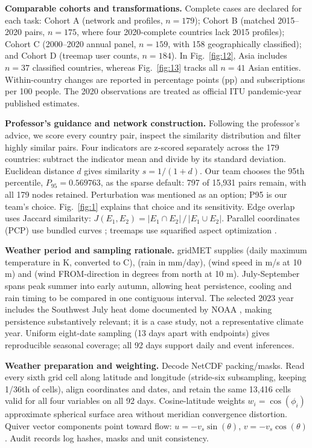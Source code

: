 \documentclass[conference,a4paper]{IEEEtran}
\begin{document}
\textbf{Comparable cohorts and transformations.} Complete cases are declared for each task: Cohort A (network and profiles, $n = 179$); Cohort B (matched 2015--2020 pairs, $n = 175$, where four 2020-complete countries lack 2015 profiles); Cohort C (2000--2020 annual panel, $n = 159$, with 158 geographically classified); and Cohort D (treemap user counts, $n = 184$). In Fig.~\ref{fig:12}, Asia includes $n = 37$ classified countries, whereas Fig.~\ref{fig:13} tracks all $n = 41$ Asian entities. Within-country changes are reported in percentage points (pp) and subscriptions per 100 people. The 2020 observations are treated as official ITU pandemic-year published estimates.

\textbf{Professor's guidance and network construction.} Following the professor's advice, we score every country pair, inspect the similarity distribution and filter highly similar pairs. Four indicators are z-scored separately across the 179 countries: subtract the indicator mean and divide by its standard deviation. Euclidean distance $d$ gives similarity $s=1/(1+d)$. Our team chooses the 95th percentile, $P_{95}=0.569763$, as the sparse default: 797 of 15,931 pairs remain, with all 179 nodes retained. Perturbation was mentioned as an option; P95 is our team's choice. Fig.~\ref{fig:1} explains that choice and its sensitivity. Edge overlap uses Jaccard similarity: $J(E_1,E_2)=|E_1 \cap E_2|\,/\,|E_1 \cup E_2|$. Parallel coordinates (PCP) use bundled curves \cite{ref10}; treemaps use squarified aspect optimization \cite{ref13}.

\textbf{Weather period and sampling rationale.} gridMET \cite{ref1} supplies  (daily maximum temperature in K, converted to C),  (rain in mm/day),  (wind speed in m/s at 10 m) and  (wind FROM-direction in degrees from north at 10 m). July-September spans peak summer into early autumn, allowing heat persistence, cooling and rain timing to be compared in one contiguous interval. The selected 2023 year includes the Southwest July heat dome documented by NOAA \cite{ref9}, making persistence substantively relevant; it is a case study, not a representative climate year. Uniform eight-date sampling (13 days apart with endpoints) gives reproducible seasonal coverage; all 92 days support daily and event inferences.

\textbf{Weather preparation and weighting.} Decode NetCDF packing/masks. Read every sixth grid cell along latitude and longitude (stride-six subsampling, keeping 1/36th of cells), align coordinates and dates, and retain the same 13,416 cells valid for all four variables on all 92 days. Cosine-latitude weights $w_i = \cos(\phi_i)$ approximate spherical surface area without meridian convergence distortion. Quiver vector components point toward flow: $u = -v_s \sin(\theta)$, $v = -v_s \cos(\theta)$. Audit records log hashes, masks and unit consistency.
\end{document}
